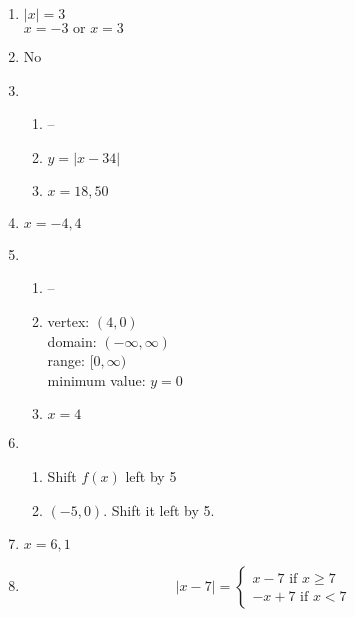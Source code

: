 \documentclass{article}
\begin{document}
\begin{enumerate}
\item $|x| = 3$ \\
	$x = -3 \text{ or } x = 3$
	
\item No
	
\item

	\begin{enumerate}
	
	\item --
	
	\item $y = |x - 34|$
	
	\item $x = 18, 50$
	
	\end{enumerate}
	
\item $x = -4, 4$

\item

	\begin{enumerate}
	
	\item --
	
	\item vertex: $(4, 0)$ \\
		domain: $(-\infty, \infty)$ \\
		range: $[0, \infty)$ \\
		minimum value: $y = 0$
		
	\item $x = 4$
	
	\end{enumerate}
	
\item

	\begin{enumerate}
	
	\item Shift $f(x)$ left by 5
	
	\item $(-5,0)$. Shift it left by 5.
	
	\end{enumerate}
	
\item $x = 6, 1$
	
\item 
	\begin{equation*}
	|x -7| = \begin{cases}
	x - 7 \text{ if } x \geq 7 \\
	-x + 7 \text{ if } x < 7
	\end{cases}
	\end{equation*}
	

\end{enumerate}
\end{document}
